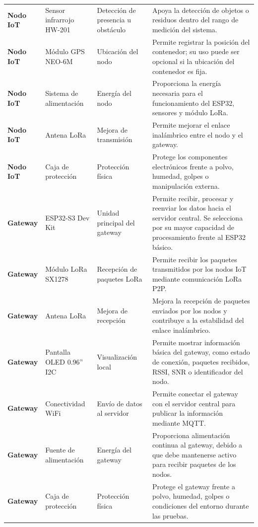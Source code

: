 \begin{xltabular}{\linewidth}{
>{\raggedright\arraybackslash}p{2.4cm}
>{\raggedright\arraybackslash}p{3.2cm}
>{\raggedright\arraybackslash}p{3.6cm}
>{\raggedright\arraybackslash}X}
\textbf{Nodo IoT} 
& Sensor infrarrojo HW-201 
& Detección de presencia u obstáculo 
& Apoya la detección de objetos o residuos dentro del rango de medición del sistema. \\

\textbf{Nodo IoT} 
& Módulo GPS NEO-6M 
& Ubicación del nodo 
& Permite registrar la posición del contenedor; su uso puede ser opcional si la ubicación del contenedor es fija. \\

\textbf{Nodo IoT} 
& Sistema de alimentación 
& Energía del nodo 
& Proporciona la energía necesaria para el funcionamiento del ESP32, sensores y módulo LoRa. \\

\textbf{Nodo IoT} 
& Antena LoRa 
& Mejora de transmisión 
& Permite mejorar el enlace inalámbrico entre el nodo y el gateway. \\

\textbf{Nodo IoT} 
& Caja de protección 
& Protección física 
& Protege los componentes electrónicos frente a polvo, humedad, golpes o manipulación externa. \\

\midrule

\textbf{Gateway} 
& ESP32-S3 Dev Kit 
& Unidad principal del gateway 
& Permite recibir, procesar y reenviar los datos hacia el servidor central. Se selecciona por su mayor capacidad de procesamiento frente al ESP32 básico. \\

\textbf{Gateway} 
& Módulo LoRa SX1278 
& Recepción de paquetes LoRa 
& Permite recibir los paquetes transmitidos por los nodos IoT mediante comunicación LoRa P2P. \\

\textbf{Gateway} 
& Antena LoRa 
& Mejora de recepción 
& Mejora la recepción de paquetes enviados por los nodos y contribuye a la estabilidad del enlace inalámbrico. \\

\textbf{Gateway} 
& Pantalla OLED 0.96'' I2C 
& Visualización local 
& Permite mostrar información básica del gateway, como estado de conexión, paquetes recibidos, RSSI, SNR o identificador del nodo. \\

\textbf{Gateway} 
& Conectividad WiFi 
& Envío de datos al servidor 
& Permite conectar el gateway con el servidor central para publicar la información mediante MQTT. \\

\textbf{Gateway} 
& Fuente de alimentación 
& Energía del gateway 
& Proporciona alimentación continua al gateway, debido a que debe mantenerse activo para recibir paquetes de los nodos. \\

\textbf{Gateway} 
& Caja de protección 
& Protección física 
& Protege el gateway frente a polvo, humedad, golpes o condiciones del entorno durante las pruebas. \\

\bottomrule
\end{xltabular}
